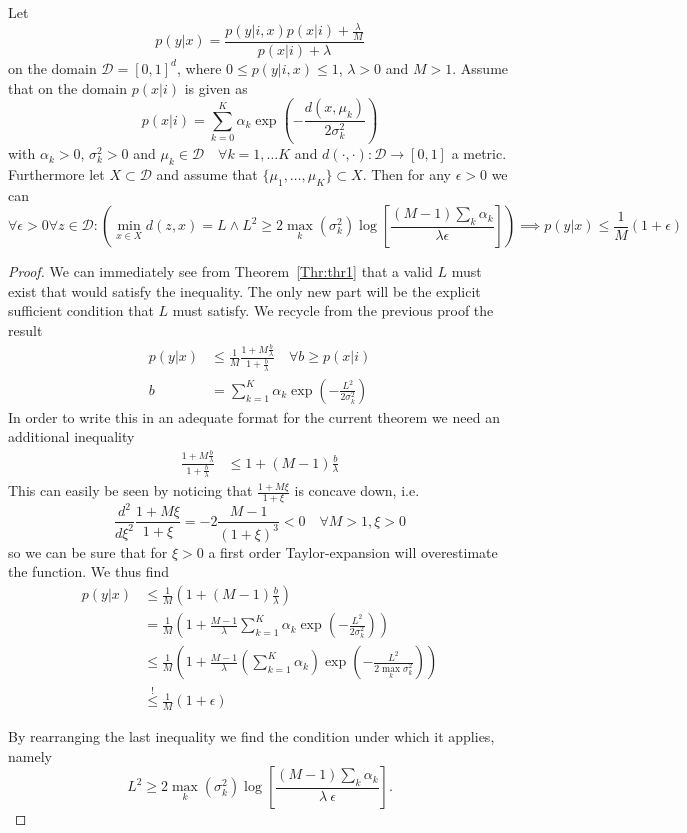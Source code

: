 \documentclass[12pt]{article}
\begin{document}
\begin{theorem}\label{Thr:thr2}
Let 
$$p(y|x)=\frac{p(y|i,x)p(x|i) + \frac{\lambda}{M} }{p(x|i) + \lambda}$$
on the domain $\mathcal{D}=[0,1]^d$, where $0\leq p(y|i,x) \leq 1$, $\lambda > 0$ and $M>1$. Assume that on the domain $p(x|i)$ is given as
$$ p(x|i) = \sum_{k=0}^K \alpha_k \exp \left(-\frac{d(x,\mu_k)}{2\sigma_k^2} \right)$$
with $\alpha_k>0$, $\sigma_k^2>0$ and $\mu_k \in \mathcal{D} \quad \forall k=1,\hdots K$ and $d(\cdot,\cdot):\mathcal{D}\rightarrow [0,1]$ a metric. Furthermore let $X \subset \mathcal{D}$ and assume that $\lbrace \mu_1, \hdots, \mu_K \rbrace \subset X$.
Then for any $\epsilon > 0$ we can 
$$ \forall \epsilon >0 \forall z\in \mathcal{D}: \left( \min_{x\in X} d(z,x)=L \land L^2 \geq 2 \max_k \left( \sigma_k^2 \right) \log \left[ \frac{(M-1)\sum_k \alpha_k}{\lambda \epsilon} \right]  \right) \implies p(y|x) \leq \frac{1}{M}(1+\epsilon) $$
\end{theorem}
\begin{proof}
We can immediately see from Theorem~\ref{Thr:thr1} that a valid $L$ must exist that would satisfy the inequality. The only new part will be the explicit sufficient condition that $L$ must satisfy. We recycle from the previous proof the result
\begin{align}
p(y|x) &\leq \frac{1}{M} \frac{1 + M \frac{b}{\lambda}  }{1+\frac{b}{\lambda} } \quad \forall b\geq p(x|i)\\
b &= \sum_{k=1}^K \alpha_k \exp \left( -\frac{L^2}{2\sigma_k^2}\right) 
\end{align}
In order to write this in an adequate format for the current theorem we need an additional inequality
\begin{align}
\frac{1 + M \frac{b}{\lambda}  }{1+\frac{b}{\lambda} } &\leq 1 + (M-1) \frac{b}{\lambda}
\end{align}
This can easily be seen by noticing that $ \frac{1 + M \xi }{1+ \xi } $ is concave down, i.e.
\begin{equation}
\frac{d^2}{d \xi ^2} \frac{1+M\xi}{1+\xi} = -2\frac{M-1}{(1+\xi)^3} < 0 \quad \forall M>1, \xi>0
\end{equation}
so we can be sure that for $\xi >0$ a first order Taylor-expansion will overestimate the function. We thus find
\begin{align}
p(y|x) &\leq \frac{1}{M} \left( 1 + (M-1) \frac{b}{\lambda} \right)  \\
&= \frac{1}{M} \left( 1 + \frac{M-1}{\lambda}  \sum_{k=1}^K \alpha_k \exp \left( -\frac{L^2}{2\sigma_k^2}\right) \right) \\
&\leq \frac{1}{M} \left( 1 +  \frac{M-1}{\lambda} \left( \sum_{k=1}^K \alpha_k \right) \exp \left( -\frac{L^2}{2 \max\limits_{k} \sigma_k^2}\right) \right)\\
&\overset{!}{\leq} \frac{1}{M} \left( 1 + \epsilon \right)
\end{align}

By rearranging the last inequality we find the condition under which it applies, namely
\begin{equation}
L^2 \geq 2 \max_k \left( \sigma_k^2 \right) \log \left[ \frac{(M-1)\sum_k \alpha_k}{\lambda \ \epsilon} \right].
\end{equation}
\end{proof}
\end{document}
